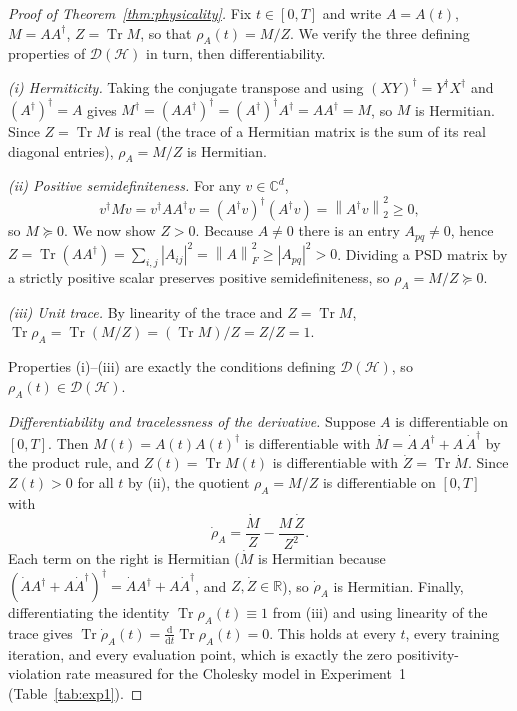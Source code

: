 \documentclass[11pt]{article}
\DeclareMathOperator{\Tr}{Tr}
\newcommand{\R}{\mathbb{R}}
\newcommand{\C}{\mathbb{C}}
\newcommand{\calD}{\mathcal{D}}
\newcommand{\dd}{\mathrm{d}}
\newcommand{\norm}[1]{\left\lVert #1 \right\rVert}
\newcommand{\abs}[1]{\left\lvert #1 \right\rvert}
\newcommand{\hilb}{\mathcal{H}}
\begin{document}
\begin{proof}[Proof of Theorem~\ref{thm:physicality}]
Fix $t\in[0,T]$ and write $A=A(t)$, $M=AA^\dagger$, $Z=\Tr M$, so that $\rho_A(t)=M/Z$. We verify the three defining properties of $\calD(\hilb)$ in turn, then differentiability.

\emph{(i) Hermiticity.} Taking the conjugate transpose and using $(XY)^\dagger=Y^\dagger X^\dagger$ and $(A^\dagger)^\dagger=A$ gives $M^\dagger=(AA^\dagger)^\dagger=(A^\dagger)^\dagger A^\dagger=AA^\dagger=M$, so $M$ is Hermitian. Since $Z=\Tr M$ is real (the trace of a Hermitian matrix is the sum of its real diagonal entries), $\rho_A=M/Z$ is Hermitian.

\emph{(ii) Positive semidefiniteness.} For any $v\in\C^d$,
\[
v^\dagger M v = v^\dagger A A^\dagger v = (A^\dagger v)^\dagger (A^\dagger v)=\norm{A^\dagger v}_2^2\ge 0,
\]
so $M\succeq0$. We now show $Z>0$. Because $A\ne0$ there is an entry $A_{pq}\ne0$, hence $Z=\Tr(AA^\dagger)=\sum_{i,j}\abs{A_{ij}}^2=\norm{A}_F^2\ge\abs{A_{pq}}^2>0$. Dividing a PSD matrix by a strictly positive scalar preserves positive semidefiniteness, so $\rho_A=M/Z\succeq0$.

\emph{(iii) Unit trace.} By linearity of the trace and $Z=\Tr M$, $\Tr\rho_A=\Tr(M/Z)=(\Tr M)/Z=Z/Z=1$.

Properties (i)--(iii) are exactly the conditions defining $\calD(\hilb)$, so $\rho_A(t)\in\calD(\hilb)$.

\emph{Differentiability and tracelessness of the derivative.} Suppose $A$ is differentiable on $[0,T]$. Then $M(t)=A(t)A(t)^\dagger$ is differentiable with $\dot M=\dot A\,A^\dagger+A\,\dot A^\dagger$ by the product rule, and $Z(t)=\Tr M(t)$ is differentiable with $\dot Z=\Tr\dot M$. Since $Z(t)>0$ for all $t$ by (ii), the quotient $\rho_A=M/Z$ is differentiable on $[0,T]$ with
\[
\dot\rho_A=\frac{\dot M}{Z}-\frac{M\,\dot Z}{Z^2}.
\]
Each term on the right is Hermitian ($\dot M$ is Hermitian because $(\dot A A^\dagger+A\dot A^\dagger)^\dagger=\dot A A^\dagger+A\dot A^\dagger$, and $Z,\dot Z\in\R$), so $\dot\rho_A$ is Hermitian. Finally, differentiating the identity $\Tr\rho_A(t)\equiv1$ from (iii) and using linearity of the trace gives $\Tr\dot\rho_A(t)=\tfrac{\dd}{\dd t}\Tr\rho_A(t)=0$. This holds at every $t$, every training iteration, and every evaluation point, which is exactly the zero positivity-violation rate measured for the Cholesky model in Experiment~1 (Table~\ref{tab:exp1}).
\end{proof}
\end{document}
